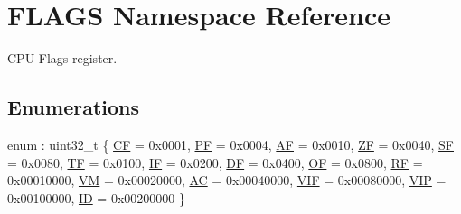 \hypertarget{namespace_f_l_a_g_s}{}\section{F\+L\+A\+GS Namespace Reference}
\label{namespace_f_l_a_g_s}


C\+PU Flags register.  


\subsection*{Enumerations}
\begin{DoxyCompactItemize}
\item 
enum \+: uint32\+\_\+t \{ \newline
\hyperlink{namespace_f_l_a_g_s_a9d5f9747a4879f4d57418def02a8fb51a1e61b18dede7337e99c57059e099a7d0}{CF} = 0x0001, 
\hyperlink{namespace_f_l_a_g_s_a9d5f9747a4879f4d57418def02a8fb51ac2a64b20f171c4a80430f79a148d31d8}{PF} = 0x0004, 
\hyperlink{namespace_f_l_a_g_s_a9d5f9747a4879f4d57418def02a8fb51abc6c39c7676dd1893ab8cac782962a46}{AF} = 0x0010, 
\hyperlink{namespace_f_l_a_g_s_a9d5f9747a4879f4d57418def02a8fb51a4ffaf63b236176ba89f7c46efb976922}{ZF} = 0x0040, 
\newline
\hyperlink{namespace_f_l_a_g_s_a9d5f9747a4879f4d57418def02a8fb51aa824ab195ddb83a9e5a8894457e1e6de}{SF} = 0x0080, 
\hyperlink{namespace_f_l_a_g_s_a9d5f9747a4879f4d57418def02a8fb51a4fd0673010631e5f1c7597b5157461bc}{TF} = 0x0100, 
\hyperlink{namespace_f_l_a_g_s_a9d5f9747a4879f4d57418def02a8fb51aec02296c8246d8621db2de2314b6728d}{IF} = 0x0200, 
\hyperlink{namespace_f_l_a_g_s_a9d5f9747a4879f4d57418def02a8fb51a6d0f5b6510bc2a40631627ef5330fbef}{DF} = 0x0400, 
\newline
\hyperlink{namespace_f_l_a_g_s_a9d5f9747a4879f4d57418def02a8fb51a10b6a3ccfa73250d20d1b2d5e6f2424f}{OF} = 0x0800, 
\hyperlink{namespace_f_l_a_g_s_a9d5f9747a4879f4d57418def02a8fb51ab410a125534d3cf535d3be32c134abff}{RF} = 0x0001\textquotesingle{}0000, 
\hyperlink{namespace_f_l_a_g_s_a9d5f9747a4879f4d57418def02a8fb51a549f5d5262483d77729683894e6d1be0}{VM} = 0x0002\textquotesingle{}0000, 
\hyperlink{namespace_f_l_a_g_s_a9d5f9747a4879f4d57418def02a8fb51af66a43e8dab676f5753b7abe62a53f62}{AC} = 0x0004\textquotesingle{}0000, 
\newline
\hyperlink{namespace_f_l_a_g_s_a9d5f9747a4879f4d57418def02a8fb51a60d8e57e033e6621fbda4b775e27ac6a}{V\+IF} = 0x0008\textquotesingle{}0000, 
\hyperlink{namespace_f_l_a_g_s_a9d5f9747a4879f4d57418def02a8fb51aea811f58ffff15c14f1a3bdb9ec09727}{V\+IP} = 0x0010\textquotesingle{}0000, 
\hyperlink{namespace_f_l_a_g_s_a9d5f9747a4879f4d57418def02a8fb51a057e038e9149d8fe2ad23df50ef42151}{ID} = 0x0020\textquotesingle{}0000
 \}
\end{DoxyCompactItemize}


